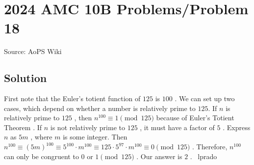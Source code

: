 \documentclass[12pt]{article}
\begin{document}
\section*{{2024 AMC 10B Problems/Problem 18}}
Source: AoPS Wiki

\subsection*{Solution}
First note that the Euler's totient function of $125$ is $100$ . We can set up two cases, which depend on whether a number is relatively prime to $125.$ If $n$ is relatively prime to $125$ , then $n^{100} \equiv 1 \pmod{125}$ because of Euler's Totient Theorem . If $n$ is not relatively prime to $125$ , it must have a factor of $5$ . Express $n$ as $5m$ , where $m$ is some integer. Then $n^{100} \equiv (5m)^{100} \equiv 5^{100}\cdot m^{100} \equiv 125 \cdot 5^{97} \cdot m^{100} \equiv 0 \pmod{125}$ . Therefore, $n^{100}$ can only be congruent to $0$ or $1 \pmod{125}$ . Our answer is $\boxed{2}$ . ~lprado
\end{document}
